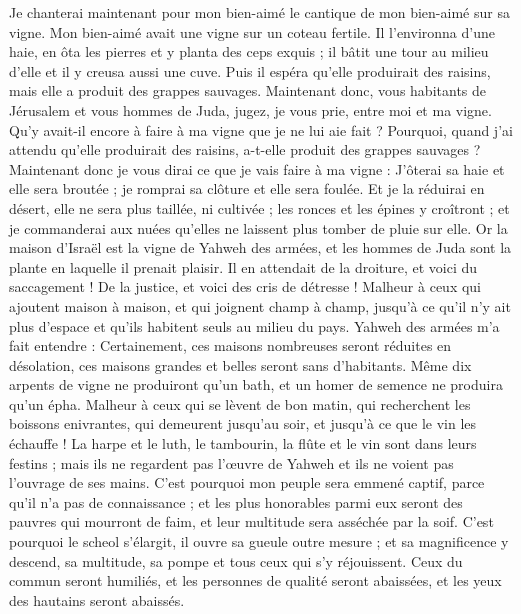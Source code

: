 \begin{multicols}{2}
\VerseOne{}Je chanterai maintenant pour mon bien-aimé le cantique de mon bien-aimé sur sa vigne. Mon bien-aimé avait une vigne sur un coteau fertile.
Il l'environna d'une haie, en ôta les pierres et y planta des ceps exquis ; il bâtit une tour au milieu d'elle et il y creusa aussi une cuve. Puis il espéra qu'elle produirait des raisins, mais elle a produit des grappes sauvages.
Maintenant donc, vous habitants de Jérusalem et vous hommes de Juda, jugez, je vous prie, entre moi et ma vigne.
Qu'y avait-il encore à faire à ma vigne que je ne lui aie fait ? Pourquoi, quand j'ai attendu qu'elle produirait des raisins, a-t-elle produit des grappes sauvages ?
Maintenant donc je vous dirai ce que je vais faire à ma vigne : J'ôterai sa haie et elle sera broutée ; je romprai sa clôture et elle sera foulée.
Et je la réduirai en désert, elle ne sera plus taillée, ni cultivée ; les ronces et les épines y croîtront ; et je commanderai aux nuées qu'elles ne laissent plus tomber de pluie sur elle.
Or la maison d'Israël est la vigne de Yahweh des armées, et les hommes de Juda sont la plante en laquelle il prenait plaisir. Il en attendait de la droiture, et voici du saccagement ! De la justice, et voici des cris de détresse !
Malheur à ceux qui ajoutent maison à maison, et qui joignent champ à champ, jusqu'à ce qu'il n'y ait plus d'espace et qu'ils habitent seuls au milieu du pays.
Yahweh des armées m'a fait entendre : Certainement, ces maisons nombreuses seront réduites en désolation, ces maisons grandes et belles seront sans d'habitants.
Même dix arpents de vigne ne produiront qu'un bath, et un homer de semence ne produira qu'un épha.
Malheur à ceux qui se lèvent de bon matin, qui recherchent les boissons enivrantes, qui demeurent jusqu'au soir, et jusqu'à ce que le vin les échauffe !
La harpe et le luth, le tambourin, la flûte et le vin sont dans leurs festins ; mais ils ne regardent pas l'œuvre de Yahweh et ils ne voient pas l'ouvrage de ses mains.
C'est pourquoi mon peuple sera emmené captif, parce qu'il n'a pas de connaissance ; et les plus honorables parmi eux seront des pauvres qui mourront de faim, et leur multitude sera asséchée par la soif.
C'est pourquoi le scheol s'élargit, il ouvre sa gueule outre mesure ; et sa magnificence y descend, sa multitude, sa pompe et tous ceux qui s'y réjouissent.
Ceux du commun seront humiliés, et les personnes de qualité seront abaissées, et les yeux des hautains seront abaissés.

\end{multicols}
